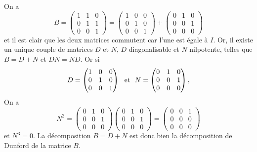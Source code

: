 {\begin{enumerate}
{On a 
$$B=\begin{pmatrix}1 & 1 & 0 \\  0&1&1 \\ 0&0&1\end{pmatrix}=
\begin{pmatrix}1 & 0& 0 \\  0&1&0 \\ 0&0&1\end{pmatrix}+
\begin{pmatrix}0& 1 & 0 \\  0&0&1 \\ 0&0&0\end{pmatrix}$$
et il est clair que les deux matrices commutent car l'une est \'egale \`a $I$. 
Or, il existe un unique couple de matrices $D$ et $N$, $D$ diagonalisable
et $N$ nilpotente, telles que $B=D+N$ et $DN=ND$. Or si
$$D=\begin{pmatrix}1 & 0& 0 \\  0&1&0 \\ 0&0&1\end{pmatrix}\ \ {\hbox{et}}\ \ 
N=\begin{pmatrix}0& 1 & 0 \\  0&0&1 \\ 0&0&0\end{pmatrix},$$
On a 
$$N^2=\begin{pmatrix}0& 1 & 0 \\  0&0&1 \\ 0&0&0\end{pmatrix}\begin{pmatrix}0& 1 & 0 \\  0&0&1 \\ 0&0&0\end{pmatrix}=\begin{pmatrix}0& 0 & 1 \\  0&0&0 \\ 0&0&0\end{pmatrix}$$
et $N^3=0$. La d\'ecomposition $B=D+N$ est donc bien la d\'ecomposition de Dunford de la matrice $B$.}
\end{enumerate}
}

